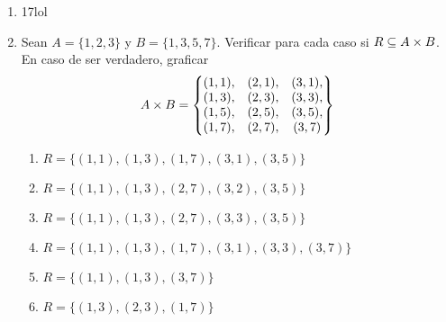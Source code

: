 \documentclass[../practica.root.tex]{subfiles}
\begin{document}
\begin{enumerate}
    \item 17lol

    \item Sean $A = \{1, 2, 3\}$ y $B = \{1, 3, 5, 7\}$. Verificar para cada caso si $R \subseteq A \times B$. En caso de ser verdadero, graficar
          \[
              A \times B = \begin{Bmatrix}
                  (1,1), & (2,1), & (3,1), \\
                  (1,3), & (2,3), & (3,3), \\
                  (1,5), & (2,5), & (3,5), \\
                  (1,7), & (2,7), & (3,7)  \\
              \end{Bmatrix}
          \]
          \begin{enumerate}
              \item $R = \{(1, 1), (1, 3), (1, 7), (3, 1), (3, 5)\}$ \cmark
              \item $R = \{(1, 1), (1, 3), (2, 7), (3, 2), (3, 5)\}$ \xmark
              \item $R = \{(1, 1), (1, 3), (2, 7), (3, 3), (3, 5)\}$ \cmark
              \item $R = \{(1, 1), (1, 3), (1, 7), (3, 1), (3, 3), (3, 7)\}$ \cmark
              \item $R = \{(1, 1), (1, 3), (3, 7)\}$ \cmark
              \item $R = \{(1, 3), (2, 3), (1, 7)\}$ \cmark
          \end{enumerate}
\end{enumerate}
\end{document}
